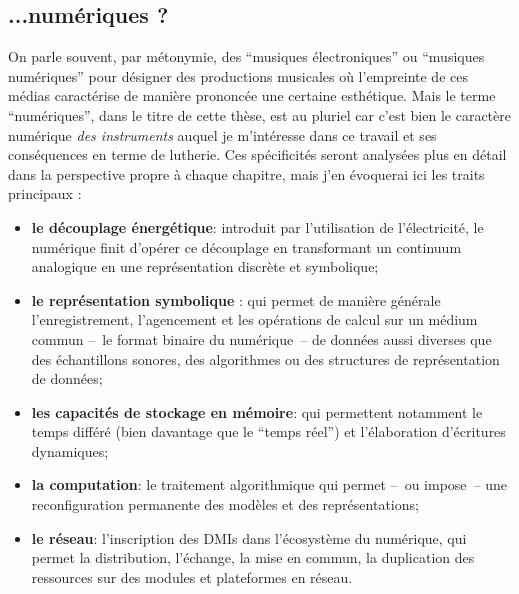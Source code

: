 

\subsection*{...numériques ?}

\noindent On parle souvent, par métonymie, des ``musiques électroniques'' ou ``musiques numériques'' pour désigner des productions musicales où l'empreinte de ces médias caractérise de manière prononcée une certaine esthétique. Mais le terme ``numériques'', dans le titre de cette thèse, est au pluriel car c'est bien le caractère numérique \textit{des instruments} auquel je m'intéresse dans ce travail et ses conséquences en terme de lutherie. Ces spécificités seront analysées plus en détail dans la perspective propre à chaque chapitre, mais j'en évoquerai ici les traits principaux :
\vspace{-1em}
\begin{itemize}[noitemsep]
\item \textbf{le découplage énergétique}: introduit par l'utilisation de l'électricité, le numérique finit d'opérer ce découplage en transformant un continuum analogique en une représentation discrète et symbolique;
\item \textbf{le représentation symbolique} : qui permet de manière générale l'enregistrement, l'agencement et les opérations de calcul sur un médium commun --~le format binaire du numérique~-- de données aussi diverses que des échantillons sonores, des algorithmes ou des structures de représentation de données;
\item \textbf{les capacités de stockage en mémoire}: qui permettent notamment le temps différé (bien davantage que le ``temps réel'') et l'élaboration d'écritures dynamiques;
\item \textbf{la computation}: le traitement algorithmique qui permet --~ou impose~-- une reconfiguration permanente des modèles et des représentations;
\item \textbf{le réseau}: l'inscription des \glspl{DMI} dans l'écosystème du numérique, qui permet la distribution, l'échange, la mise en commun, la duplication des ressources sur des modules et plateformes en réseau.
\end{itemize}

